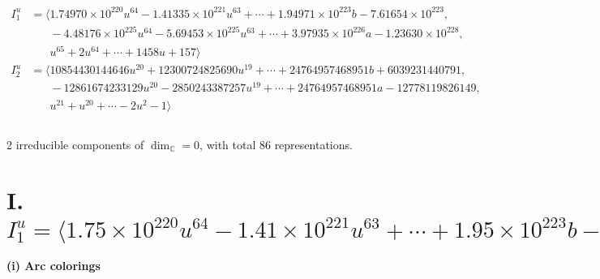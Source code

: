 \documentclass[1p]{elsarticle_modified}
\theoremstyle{definition}
\begin{document}
\begin{align*}
I^u_{1}&=\langle 
1.74970\times10^{220} u^{64}-1.41335\times10^{221} u^{63}+\cdots+1.94971\times10^{223} b-7.61654\times10^{223},\\
\phantom{I^u_{1}}&\phantom{= \langle  }-4.48176\times10^{225} u^{64}-5.69453\times10^{225} u^{63}+\cdots+3.97935\times10^{226} a-1.23630\times10^{228},\\
\phantom{I^u_{1}}&\phantom{= \langle  }u^{65}+2 u^{64}+\cdots+1458 u+157\rangle \\
I^u_{2}&=\langle 
10854430144646 u^{20}+12300724825690 u^{19}+\cdots+24764957468951 b+6039231440791,\\
\phantom{I^u_{2}}&\phantom{= \langle  }-12861674233129 u^{20}-2850243387257 u^{19}+\cdots+24764957468951 a-12778119826149,\\
\phantom{I^u_{2}}&\phantom{= \langle  }u^{21}+u^{20}+\cdots-2 u^2-1\rangle \\
\\
\end{align*}
\raggedright * 2 irreducible components of $\dim_{\mathbb{C}}=0$, with total 86 representations.\\
\newpage
\renewcommand{\arraystretch}{1}
\centering \section*{I. $I^u_{1}= \langle 1.75\times10^{220} u^{64}-1.41\times10^{221} u^{63}+\cdots+1.95\times10^{223} b-7.62\times10^{223},\;-4.48\times10^{225} u^{64}-5.69\times10^{225} u^{63}+\cdots+3.98\times10^{226} a-1.24\times10^{228},\;u^{65}+2 u^{64}+\cdots+1458 u+157 \rangle$}
\flushleft \textbf{(i) Arc colorings}\\
\end{document}
